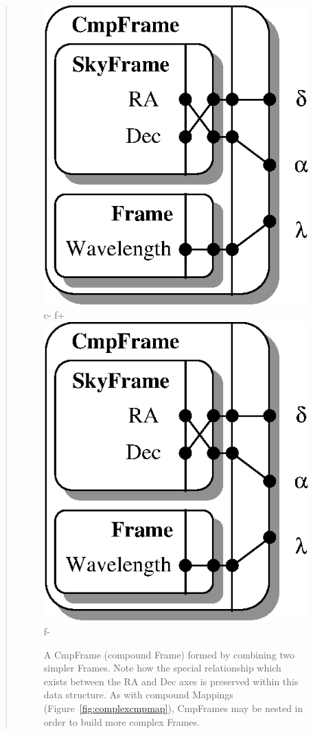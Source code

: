 \documentclass[twoside,11pt]{article}
\begin{document}
{\begin{htmlonly}
\begin{quote}
\begin{figure}
   \includegraphics[scale=1.5]{sun211_figures/cmpframe.eps}
c-
f+
   \includegraphics[scale=1.5]{sun210_figures/cmpframe.eps}
f-
   \caption{A CmpFrame (compound Frame) formed by combining two simpler
   Frames. Note how the special relationship which exists between the RA
   and Dec axes is preserved within this data structure. As with compound
   Mappings (Figure~\ref{fig:complexcmpmap}), CmpFrames may be nested in
   order to build more complex Frames.}
   \end{figure}
   \end{quote}
\end{htmlonly}

}
\end{document}

